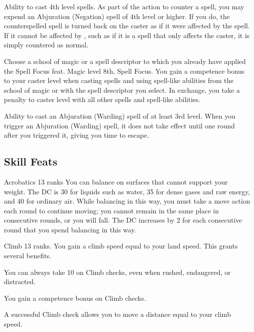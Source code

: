  Ability to cast 4th level spells.
 As part of the action to counter a spell, you may expend an Abjuration (Negation) spell of 4th level or higher. If you do, the counterspelled spell is turned back on the caster as if it were affected by the  spell. If it cannot be affected by , such as if it is a spell that only affects the caster, it is simply countered as normal.

Choose a school of magic or a spell descriptor to which you already have applied the Spell Focus feat.
\featpre Magic level 8th, Spell Focus.
\featben You gain a  competence bonus to your caster level when casting spells and using spell-like abilities from the school of magic or with the spell descriptor you select. In exchange, you take a  penalty to caster level with all other spells and spell-like abilities.

\featpre Ability to cast an Abjuration (Warding) spell of at least 3rd level.
\featben When you trigger an Abjuration (Warding) spell, it does not take effect until one round after you triggered it, giving you time to escape.

\subsection{Skill Feats}

\featpre Acrobatics 13 ranks
\featben You can balance on surfaces that cannot support your weight. The DC is 30 for liquids such as water, 35 for dense gases and raw energy, and 40 for ordinary air. While balancing in this way, you must take a move action each round to continue moving; you cannot remain in the same place in consecutive rounds, or you will fall. The DC increases by 2 for each consecutive round that you spend balancing in this way.

\featpre Climb 13 ranks.
\featben You gain a climb speed equal to your land speed. This grants several benefits. 
\begin{itemize*}
  \item You can always take 10 on Climb checks, even when rushed, endangered, or distracted. 
  \item You gain a  competence bonus on Climb checks.
  \item A successful Climb check allows you to move a distance equal to your climb speed.
\end{itemize*}

